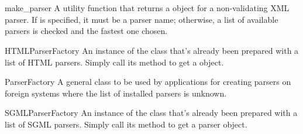 \documentclass{howto}
\begin{document}

\section{}

\begin{funcdesc}{make_parser}{}
A utility function that returns a  object for a
non-validating XML parser.  If  is specified, it must be a 
parser name; otherwise, a list of available parsers is checked and the
fastest one chosen.
\end{funcdesc}

\begin{datadesc}{HTMLParserFactory}
An instance of the  class that's already been
prepared with a list of HTML parsers.  Simply call its
 method to get a  object. 
\end{datadesc}

\begin{classdesc}{ParserFactory}{}
A general class to be used by applications for creating parsers on
foreign systems where the list of installed parsers is unknown.
\end{classdesc}

\begin{datadesc}{SGMLParserFactory}
An instance of the  class that's already been
prepared with a list of SGML parsers.  Simply call its
 method to get a parser object. 
\end{datadesc}
\end{document}
